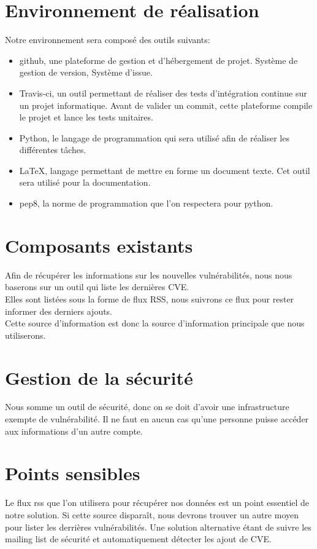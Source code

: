 \section{Environnement de réalisation}
Notre environnement sera composé des outils suivants:\\
\begin{itemize}
\item github, une plateforme de gestion et d'hébergement de projet. Système de gestion de version, Système d’issue.
\item Travis-ci, un outil permettant de réaliser des tests d’intégration continue sur un projet informatique. Avant de valider un commit, cette plateforme compile le projet et lance les tests unitaires.\\
\item Python, le langage de programmation qui sera utilisé afin de réaliser les différentes tâches.\\
\item LaTeX, langage permettant de mettre en forme un document texte. Cet outil sera utilisé pour la documentation.\\
\item pep8, la norme de programmation que l’on respectera pour python.\\
\end{itemize}

\section{Composants existants}
Afin de récupérer les informations sur les nouvelles vulnérabilités, nous nous baserons sur un outil qui liste les dernières CVE.\\
Elles sont listées sous la forme de flux RSS, nous suivrons ce flux pour rester informer des derniers ajouts.\\
Cette source d’information est donc la source d’information principale que nous utiliserons.\\

\section{Gestion de la sécurité}
Nous somme un outil de sécurité, donc on se doit  d’avoir une infrastructure exempte de vulnérabilité. Il ne faut en aucun cas qu’une personne puisse accéder aux informations d’un autre compte.\\

\section{Points sensibles}
Le flux rss que l’on utilisera pour récupérer nos données est un point essentiel de notre solution. Si cette source disparaît, nous devrons trouver un autre moyen pour lister les derrières vulnérabilités. Une solution alternative étant de suivre les mailing list de sécurité et automatiquement détecter les ajout de CVE.\\